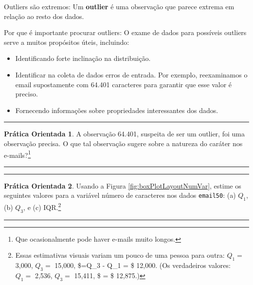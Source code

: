 \documentclass[
]{book}
\theoremstyle{definition}
\theoremstyle{definition}
\theoremstyle{definition}
\newtheorem{exercise}{Prática Orientada}[chapter]
\theoremstyle{definition}
\theoremstyle{remark}
\begin{document}
Outliers são extremos: Um \textbf{outlier} é uma observação que parece extrema em relação ao resto dos dados.

Por que é importante procurar outliers: O exame de dados para possíveis outliers serve a muitos propósitos úteis, incluindo:

\begin{itemize}
\item
  Identificando forte inclinação na distribuição.
\item
  Identificar na coleta de dados erros de entrada. Por exemplo, reexaminamos o email supostamente com 64.401 caracteres para garantir que esse valor é preciso.
\item
  Fornecendo informações sobre propriedades interessantes dos dados.
\end{itemize}

\begin{center}\rule{0.5\linewidth}{0.5pt}\end{center}

\begin{exercise}
\protect\hypertarget{exr:unnamed-chunk-28}{}{\label{exr:unnamed-chunk-28} }A observação 64.401, suspeita de ser um outlier, foi uma observação precisa. O que tal observação sugere sobre a natureza do caráter nos e-mails?\footnote{Que ocasionalmente pode haver e-mails muito longos.}
\end{exercise}

\begin{center}\rule{0.5\linewidth}{0.5pt}\end{center}

\begin{center}\rule{0.5\linewidth}{0.5pt}\end{center}

\begin{exercise}
\protect\hypertarget{exr:unnamed-chunk-29}{}{\label{exr:unnamed-chunk-29} }Usando a Figura \ref{fig:boxPlotLayoutNumVar}, estime os seguintes valores para a variável número de caracteres nos dados \texttt{email50}: (a) \(Q_1\), (b) \(Q_3\), e (c) IQR.\footnote{Essas estimativas visuais variam um pouco de uma pessoa para outra: \(Q_1=\) 3,000, \(Q_3=\) 15,000, \$=Q\_3 - Q\_1 = \$ 12,000. (Os verdadeiros valores: \(Q_1=\) 2,536, \(Q_3=\) 15,411, \$ = \$ 12,875.)}
\end{exercise}

\begin{center}\rule{0.5\linewidth}{0.5pt}\end{center}
\end{document}

